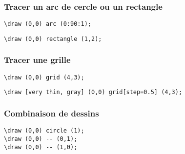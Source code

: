 \documentclass{clic_latex_beamer}
\begin{document}
\begin{frame}[fragile]
\frametitle{Tracer un arc de cercle ou un rectangle}

\begin{multicols}{2}

\begin{lstlisting}
\draw (0,0) arc (0:90:1);
\end{lstlisting}

\columnbreak
\pause



\begin{lstlisting}
\draw (0,0) rectangle (1,2);
\end{lstlisting}

\end{multicols}

\end{frame}

\begin{frame}[fragile]
\frametitle{Tracer une grille}

\begin{multicols}{2}
\begin{lstlisting}
\draw (0,0) grid (4,3);
\end{lstlisting}


\columnbreak
\pause

\begin{lstlisting}
\draw [very thin, gray] (0,0) grid[step=0.5] (4,3);
\end{lstlisting}


\end{multicols}

\end{frame}

\begin{frame}[fragile]
\frametitle{Combinaison de dessins}



\begin{lstlisting}
\draw (0,0) circle (1);
\draw (0,0) -- (0,1);
\draw (0,0) -- (1,0);
\end{lstlisting}

\end{frame}
\end{document}
